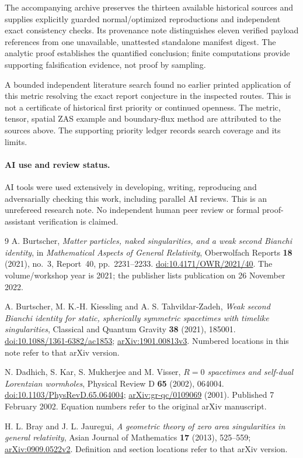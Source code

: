 \documentclass[11pt]{article}
\begin{document}
The accompanying archive preserves the thirteen available historical sources
and supplies explicitly guarded normal/optimized reproductions and independent
exact consistency checks. Its provenance note distinguishes eleven verified
payload references from one unavailable, unattested standalone manifest digest.
The analytic proof establishes the quantified conclusion; finite computations
provide supporting falsification evidence, not proof by sampling.

A bounded independent literature search found no earlier printed application
of this metric resolving the exact report conjecture in the inspected
routes. This is not a certificate of historical first priority or continued
openness. The metric, tensor, spatial ZAS example and boundary-flux method
are attributed to the sources above. The supporting priority ledger records
search coverage and its limits.

\paragraph{AI use and review status.}
AI tools were used extensively in developing, writing, reproducing and
adversarially checking this work, including parallel AI reviews. This is an
unrefereed research note. No independent human peer review or formal
proof-assistant verification is claimed.

\begin{thebibliography}{9}
\small
{}
A. Burtscher, \emph{Matter particles, naked singularities, and a weak second
Bianchi identity}, in \emph{Mathematical Aspects of General Relativity},
Oberwolfach Reports \textbf{18} (2021), no.~3, Report~40, pp.~2231--2233.
\href{https://doi.org/10.4171/OWR/2021/40}{doi:10.4171/OWR/2021/40}.
The volume/workshop year is 2021; the publisher lists publication on
26 November 2022.

A. Burtscher, M. K.-H. Kiessling and A. S. Tahvildar-Zadeh,
\emph{Weak second Bianchi identity for static, spherically symmetric
spacetimes with timelike singularities}, Classical and Quantum Gravity
\textbf{38} (2021), 185001.
\href{https://doi.org/10.1088/1361-6382/ac1853}{doi:10.1088/1361-6382/ac1853};
\href{https://arxiv.org/abs/1901.00813v3}{arXiv:1901.00813v3}.
Numbered locations in this note refer to that arXiv version.

N. Dadhich, S. Kar, S. Mukherjee and M. Visser,
\emph{$R=0$ spacetimes and self-dual Lorentzian wormholes},
Physical Review D \textbf{65} (2002), 064004.
\href{https://doi.org/10.1103/PhysRevD.65.064004}{doi:10.1103/PhysRevD.65.064004};
\href{https://arxiv.org/abs/gr-qc/0109069}{arXiv:gr-qc/0109069} (2001).
Published 7 February 2002. Equation numbers refer to the original arXiv
manuscript.

H. L. Bray and J. L. Jauregui, \emph{A geometric theory of zero area
singularities in general relativity}, Asian Journal of Mathematics
\textbf{17} (2013), 525--559;
\href{https://arxiv.org/abs/0909.0522v2}{arXiv:0909.0522v2}.
Definition and section locations refer to that arXiv version.
\end{thebibliography}
\end{document}
